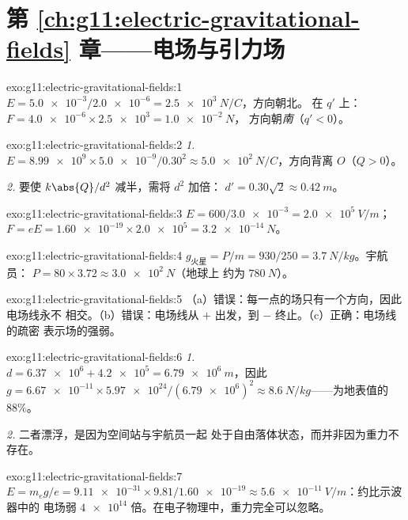 \section*{第 \ref{ch:g11:electric-gravitational-fields} 章——电场与引力场}

\begin{solution}{exo:g11:electric-gravitational-fields:1}
$E = \num{5.0e-3} / \num{2.0e-6} = \qty{2.5e3}{N/C}$，方向朝北。
在 $q'$ 上：$F = \num{4.0e-6} \times \num{2.5e3} = \qty{1.0e-2}{N}$，
方向朝\emph{南}（$q' < 0$）。
\end{solution}

\begin{solution}{exo:g11:electric-gravitational-fields:2}
\emph{1.} $E = \num{8.99e9} \times \num{5.0e-9} / 0.30^2
\approx \qty{5.0e2}{N/C}$，方向背离 $O$（$Q > 0$）。

\emph{2.} 要使 $k\abs{Q}/d^2$ 减半，需将 $d^2$ 加倍：
$d' = 0.30\sqrt{2} \approx \qty{0.42}{m}$。
\end{solution}

\begin{solution}{exo:g11:electric-gravitational-fields:3}
$E = 600 / \num{3.0e-3} = \qty{2.0e5}{V/m}$；
$F = eE = \num{1.60e-19} \times \num{2.0e5} = \qty{3.2e-14}{N}$。
\end{solution}

\begin{solution}{exo:g11:electric-gravitational-fields:4}
$g_{\text{火星}} = P/m = 930/250 = \qty{3.7}{N/kg}$。宇航员：
$P = 80 \times 3.72 \approx \qty{3.0e2}{N}$（地球上
约为 $\qty{780}{N}$）。
\end{solution}

\begin{solution}{exo:g11:electric-gravitational-fields:5}
（a）错误：每一点的场只有一个方向，因此电场线永不
相交。（b）错误：电场线从 $+$ 出发，到 $-$ 终止。（c）正确：电场线的疏密
表示场的强弱。
\end{solution}

\begin{solution}{exo:g11:electric-gravitational-fields:6}
\emph{1.} $d = \num{6.37e6} + \num{4.2e5} = \qty{6.79e6}{m}$，因此
$g = \num{6.67e-11} \times \num{5.97e24} / (\num{6.79e6})^2
\approx \qty{8.6}{N/kg}$——为地表值的 $88\%$。

\emph{2.} 二者漂浮，是因为空间站与宇航员一起
处于自由落体状态，而并非因为重力不存在。
\end{solution}

\begin{solution}{exo:g11:electric-gravitational-fields:7}
$E = m_e g / e = \num{9.11e-31} \times 9.81 / \num{1.60e-19}
\approx \qty{5.6e-11}{V/m}$：约比示波器中的
电场弱 $\num{4e14}$ 倍。在电子物理中，重力完全可以忽略。
\end{solution}

